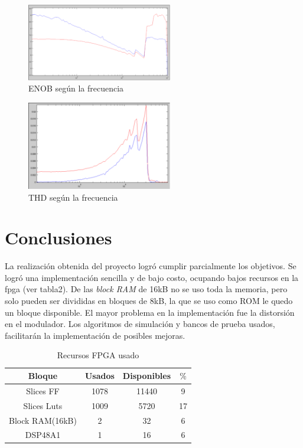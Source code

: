 \documentclass[a4paper,conference]{IEEEtran}
\begin{document}
\begin{figure}[!t]
\centering
\includegraphics[width=2.5in]{Medicion_ENOB}
\caption{ENOB seg\'un la frecuencia}
\label{fig_13}
\end{figure}

\begin{figure}[!t]
\centering
\includegraphics[width=2.5in]{Medicion_THD}
\caption{THD seg\'un la frecuencia}
\label{fig_14}
\end{figure}

\section{Conclusiones}
La realización obtenida del proyecto logr\'o cumplir parcialmente los objetivos. Se logr\'o una implementaci\'on sencilla y de bajo costo, ocupando bajos recursos en la fpga (ver tabla2). De las \textit{block RAM} de 16kB no se uso toda la memoria, pero solo pueden ser divididas en bloques de 8kB, la que se uso como ROM le quedo un bloque disponible. El mayor problema en la implementaci\'on fue la distorsi\'on en el modulador. Los algoritmos de simulaci\'on y bancos de prueba usados, facilitar\'an la implementaci\'on de posibles mejoras.
\begin{table}
\renewcommand{\arraystretch}{1.3}
\caption{Recursos FPGA usado}
\label{Tabla_2}
\centering
\begin{tabular}{|c|c|c|c|}
\hline
Bloque & Usados & Disponibles & $\%$ \\
\hline
Slices FF & 1078 & 11440 & 9\\
\hline
Slices Luts & 1009 & 5720 & 17\\
\hline
Block RAM(16kB) & 2 & 32 & 6\\
\hline
DSP48A1 & 1 & 16 & 6\\
\hline
\end{tabular}
\end{table}
\end{document}
